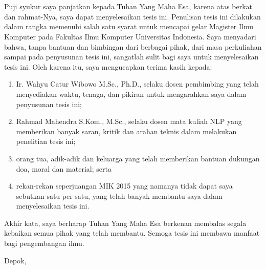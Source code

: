 \chapter*{\kataPengantar}

Puji syukur saya panjatkan kepada Tuhan Yang Maha Esa, karena atas berkat dan rahmat-Nya, saya dapat menyelesaikan tesis ini. Penulisan tesis ini dilakukan dalam rangka memenuhi salah satu syarat untuk mencapai gelar Magister Ilmu Komputer pada Fakultas Ilmu Komputer Universitas Indonesia. Saya menyadari bahwa, tanpa bantuan dan bimbingan dari berbagai pihak, dari masa perkuliahan sampai pada penyusunan tesis ini, sangatlah sulit bagi saya untuk menyelesaikan tesis ini. Oleh karena itu, saya mengucapkan terima kasih kepada:

\begin{enumerate}
	\item Ir. Wahyu Catur Wibowo M.Sc., Ph.D., selaku dosen pembimbing yang telah menyediakan waktu, tenaga, dan pikiran untuk mengarahkan saya dalam penyusunan tesis ini;
	\item Rahmad Mahendra S.Kom., M.Sc., selaku dosen mata kuliah NLP yang memberikan banyak saran, kritik dan arahan teknis dalam melakukan penelitian tesis ini;
	\item orang tua, adik-adik dan keluarga yang telah memberikan bantuan dukungan doa, moral dan material; serta
	\item rekan-rekan seperjuangan MIK 2015 yang namanya tidak dapat saya sebutkan satu per satu, yang telah banyak membantu saya dalam menyelesaikan tesis ini.
\end{enumerate}

Akhir kata, saya berharap Tuhan Yang Maha Esa berkenan membalas segala kebaikan semua pihak yang telah membantu. Semoga tesis ini membawa manfaat bagi pengembangan ilmu.

\vspace*{0.1cm}
\begin{flushright}
Depok, \tanggalPengesahan\\[0.1cm]
\vspace*{1cm}
\penulis

\end{flushright}